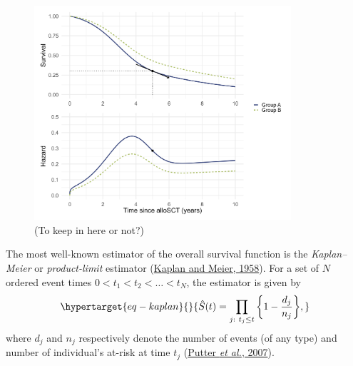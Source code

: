 \documentclass[
  letterpaper,
  DIV=11,
  numbers=noendperiod]{scrreprt}
\begin{document}
\begin{figure}

{\centering \includegraphics[width=0.85\textwidth,height=\textheight]{figures/haz_surv_panels.png}

}

\caption{\label{fig-intro-haz}(To keep in here or not?)}

\end{figure}

The most well-known estimator of the overall survival function is the
\emph{Kaplan--Meier} or \emph{product-limit} estimator
(\protect\hyperlink{ref-kaplanNonparametricEstimationIncomplete1958}{Kaplan
and Meier, 1958}). For a set of \(N\) ordered event times
\(0 < t_1 < t_2 < \dots < t_N\), the estimator is given by
\begin{equation}\protect\hypertarget{eq-kaplan}{}{
\hat{S}(t) = \prod_{j:\ t_j \leq t} \bigg\{1 - \frac{d_j}{n_j}\bigg\},
}\label{eq-kaplan}\end{equation} where \(d_j\) and \(n_j\) respectively
denote the number of events (of any type) and number of individual's
at-risk at time \(t_j\)
(\protect\hyperlink{ref-putterTutorialBiostatisticsCompeting2007}{Putter
\emph{et al.}, 2007}).
\end{document}
